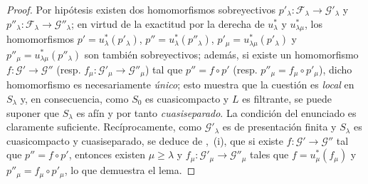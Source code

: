 \begin{proof}
Por hipótesis existen dos homomorfismos sobreyectivos $p'_\lambda:\mathcal F_\lambda\to\mathcal G'_\lambda$ y $p''_\lambda:\mathcal F_\lambda\to\mathcal G''_\lambda$; en virtud de la exactitud por la derecha de $u_\lambda^*$ y $u_{\lambda\mu}^*$, los homomorfismos $p'=u_\lambda^*(p'_\lambda)$, $p''=u_\lambda^*(p''_\lambda)$, $p'_\mu=u_{\lambda\mu}^*(p'_\lambda)$ y $p''_\mu=u_{\lambda\mu}^*(p''_\lambda)$ son también sobreyectivos; además, si existe un homomorfismo $f:\mathcal G'\to\mathcal G''$ (resp. $f_\mu:\mathcal G'_\mu\to\mathcal G''_\mu$) tal que $p''=f\circ p'$ (resp. $p''_\mu=f_\mu\circ p'_\mu$), dicho homomorfismo es necesariamente \emph{único}; esto muestra que la cuestión es \emph{local} en $S_\lambda$ y, en consecuencia, como $S_0$ es cuasicompacto y $L$ es filtrante, se puede suponer que $S_\lambda$ es afín y por tanto \emph{cuasiseparado}. La condición del enunciado es claramente suficiente. Recíprocamente, como $\mathcal G'_\lambda$ es de presentación finita y $S_\lambda$ es cuasicompacto y cuasiseparado, se deduce de ,~(i), que si existe $f:\mathcal G'\to\mathcal G''$ tal que $p''=f\circ p'$, entonces existen $\mu\geq\lambda$ y $f_\mu:\mathcal G'_\mu\to\mathcal G''_\mu$ tales que $f=u_\mu^*(f_\mu)$ y $p''_\mu=f_\mu\circ p'_\mu$, lo que demuestra el lema.
\end{proof}

